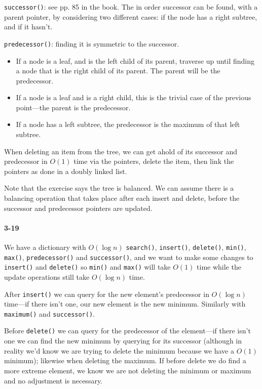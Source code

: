 \documentclass{report}
\begin{document}

\lstinline!successor()!: see pp. 85 in the book. The in order successor can be found, with a parent pointer, by considering two different cases: if the node has a right subtree, and if it hasn't.

\lstinline!predecessor()!: finding it is symmetric to the successor.
\begin{itemize}
	\item If a node is a leaf, and is the left child of its parent, traverse up until finding a node that is the right child of its parent. The parent will be the predecessor.
	\item If a node is a leaf and is a right child, this is the trivial case of the previous point---the parent is the predecessor.
	\item If a node has a left subtree, the predecessor is the maximum of that left subtree.
\end{itemize}

When deleting an item from the tree, we can get ahold of its successor and predecessor in $O(1)$ time via the pointers, delete the item, then link the pointers as done in a doubly linked list.

Note that the exercise says the tree is balanced. We can assume there is a balancing operation that takes place after each insert and delete, before the successor and predecessor pointers are updated.

\paragraph{3-19} We have a dictionary with $O(\log n)$ \lstinline!search()!, \lstinline!insert()!, \lstinline!delete()!, \lstinline!min()!, \lstinline!max()!, \lstinline!predecessor()! and \lstinline!successor()!, and we want to make some changes to \lstinline!insert()! and \lstinline!delete()! so \lstinline!min()! and \lstinline!max()! will take $O(1)$ time while the update operations still take $O(\log n)$ time.

After \lstinline!insert()! we can query for the new element's predecessor in $O(\log n)$ time---if there isn't one, our new element is the new minimum. Similarly with \lstinline!maximum()! and \lstinline!successor()!.

Before \lstinline!delete()! we can query for the predecessor of the element---if there isn't one we can find the new minimum by querying for its successor (although in reality we'd know we are trying to delete the minimum because we have a $O(1)$ minimum); likewise when deleting the maximum. If before delete we do find a more extreme element, we know we are not deleting the minimum or maximum and no adjustment is necessary.
\end{document}
